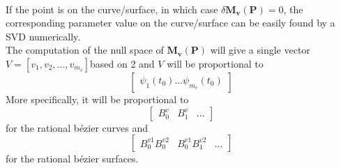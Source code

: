 \paragraph{}
If the point is on the curve/surface, in which case $\delta\mathbf{M_v}(\mathbf{P}) = 0$, the corresponding parameter value on the curve/surface can be easily found by a SVD numerically.\\
The computation of the null space of $\mathbf{M_v}(\mathbf{P}) $ will give a single vector $V=[v_1,v_2,\dots,v_{m_v}]$based on 2 and $V$ will be proportional to 
\begin{equation*}
	\begin{bmatrix}
	\psi_1(t_0) \dots \psi_{m_v}(t_0)
	\end{bmatrix}
\end{equation*}
More specifically, it will be proportional to
\begin{equation*}
	\begin{bmatrix}
		B_0^v & B_1^v & \dots
	\end{bmatrix}
\end{equation*}
for the rational bézier curves and
\begin{equation*}
	\begin{bmatrix}
		B_0^{v1}B_0^{v2} & B_0^{v1}B_1^{v2} & \dots
	\end{bmatrix}
\end{equation*}
for the rational bézier surfaces.